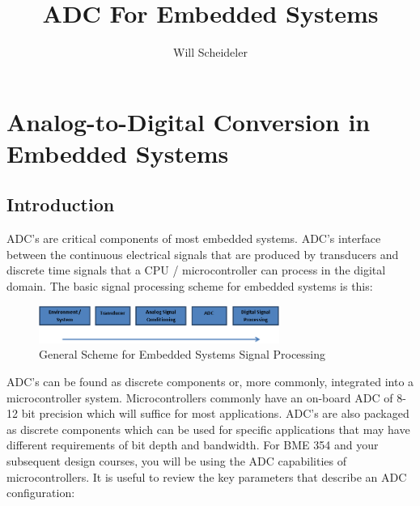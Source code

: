 \documentclass[10pt]{report}
\title{ADC For Embedded Systems}
\author{Will Scheideler}
\begin{document}
\section*{Analog-to-Digital Conversion in Embedded Systems}

\subsection*{Introduction}
	ADC’s are critical components of most embedded systems. ADC’s interface between the continuous electrical signals that are produced by transducers and discrete time signals that a CPU / microcontroller can process in the digital domain. The basic signal processing scheme for embedded systems is this: 

\begin{figure}[H]
\centering
   \includegraphics[width=0.7\textwidth]{ADC_1.png}
    \caption{General Scheme for Embedded Systems Signal Processing}
\end{figure}

\par
ADC’s can be found as discrete components or, more commonly, integrated into a microcontroller system. Microcontrollers commonly have an on-board ADC of 8-12 bit precision which will suffice for most applications. ADC’s are also packaged as discrete components which can be used for specific applications that may have different requirements of bit depth and bandwidth. For BME 354 and your subsequent design courses, you will be using the ADC capabilities of microcontrollers. It is useful to review the key parameters that describe an ADC configuration:
\end{document}
